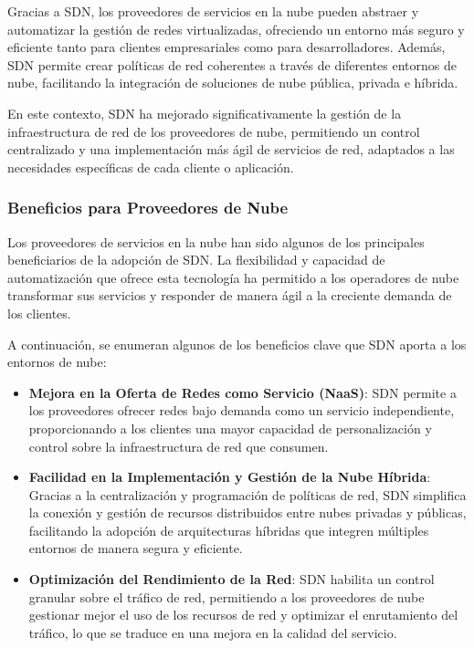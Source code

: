 {            Gracias a SDN, los proveedores de servicios en la nube pueden abstraer y automatizar la gestión de redes virtualizadas, ofreciendo un entorno más seguro y eficiente tanto para clientes empresariales como para desarrolladores. Además, SDN permite crear políticas de red coherentes a través de diferentes entornos de nube, facilitando la integración de soluciones de nube pública, privada e híbrida.
            
            En este contexto, SDN ha mejorado significativamente la gestión de la infraestructura de red de los proveedores de nube, permitiendo un control centralizado y una implementación más ágil de servicios de red, adaptados a las necesidades específicas de cada cliente o aplicación.
            
            \subsubsection{Beneficios para Proveedores de Nube}
                Los proveedores de servicios en la nube han sido algunos de los principales beneficiarios de la adopción de SDN. La flexibilidad y capacidad de automatización que ofrece esta tecnología ha permitido a los operadores de nube transformar sus servicios y responder de manera ágil a la creciente demanda de los clientes.
                
                A continuación, se enumeran algunos de los beneficios clave que SDN aporta a los entornos de nube:
                
                \begin{itemize}
                    \item \textbf{Mejora en la Oferta de Redes como Servicio (NaaS)}: SDN permite a los proveedores ofrecer redes bajo demanda como un servicio independiente, proporcionando a los clientes una mayor capacidad de personalización y control sobre la infraestructura de red que consumen.
                
                    \item \textbf{Facilidad en la Implementación y Gestión de la Nube Híbrida}: Gracias a la centralización y programación de políticas de red, SDN simplifica la conexión y gestión de recursos distribuidos entre nubes privadas y públicas, facilitando la adopción de arquitecturas híbridas que integren múltiples entornos de manera segura y eficiente.
                
                    \item \textbf{Optimización del Rendimiento de la Red}: SDN habilita un control granular sobre el tráfico de red, permitiendo a los proveedores de nube gestionar mejor el uso de los recursos de red y optimizar el enrutamiento del tráfico, lo que se traduce en una mejora en la calidad del servicio.
                

\end{itemize}}
